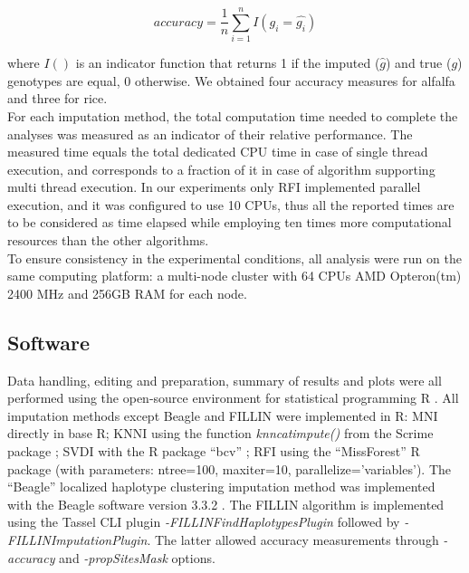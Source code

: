 \begin{equation}
\label{eq:accuracy}
accuracy = \frac{1}{n} \sum_{i=1}^{n}{I(g_i = \hat{g_i})}
\end{equation}

where $I()$ is an indicator function that returns 1 if the imputed ($\hat{g}$) and true ($g$) genotypes are equal, 0 otherwise. We obtained four accuracy measures for alfalfa and three for rice.\\
For each imputation method, the total computation time needed to complete the analyses was measured as an indicator of their relative performance. The measured time equals the total dedicated CPU time in case of single thread execution, and corresponds to a fraction of it in case of algorithm supporting multi thread execution. In our experiments only RFI implemented parallel execution, and it was configured to use 10 CPUs, thus all the reported times are to be considered as time elapsed while employing ten times more computational resources than the other algorithms.\\
To ensure consistency in the experimental conditions, all analysis were run on the same computing platform: a multi-node cluster with 64 CPUs AMD Opteron(tm) 2400 MHz and 256GB RAM for each node.
 
\subsection{Software}
\label{sec:software}
Data handling, editing and preparation, summary of results and plots were all performed using the open-source environment for statistical programming R \cite{r_core_team_r:_2014}. All imputation methods except Beagle and FILLIN were implemented in R: MNI directly in base R; KNNI using the function \emph{knncatimpute()} from the Scrime package \cite{schwender_scrime:_2013}; SVDI with the R package ``bcv'' \cite{perry_bcv:_2009}; RFI using the ``MissForest'' \cite{stekhoven_missforestnon-parametric_2012} R package (with parameters: ntree=100, maxiter=10, parallelize='variables'). The ``Beagle'' localized haplotype clustering imputation method was implemented with the Beagle software version 3.3.2 \cite{browning_rapid_2007}. The FILLIN algorithm is implemented using the Tassel CLI plugin \emph{-FILLINFindHaplotypesPlugin} followed by \emph{-FILLINImputationPlugin}. The latter allowed accuracy measurements through \emph{-accuracy} and \emph{-propSitesMask} options.


